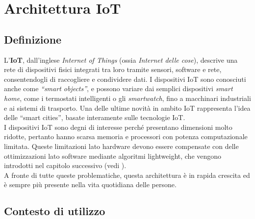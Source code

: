 \chapter{Architettura IoT}

\section{Definizione}

L'\textbf{IoT}, dall'inglese \textit{Internet of Things} (ossia \textit{Internet delle cose}), descrive una rete di dispositivi fisici integrati tra loro tramite sensori, software e rete, consentendogli di raccogliere e condividere dati. I dispositivi IoT sono conosciuti anche come \textit{``smart objects''}, e possono variare dai semplici dispositivi \textit{smart home}, come i termostati intelligenti o gli \textit{smartwatch}, fino a macchinari industriali e ai sistemi di trasporto. Una delle ultime novità in ambito IoT rappresenta l'idea delle ``smart cities'', basate interamente sulle tecnologie IoT\cite{iot-intro}. \\

\noindent I dispositivi IoT sono degni di interesse perché presentano dimensioni molto ridotte, pertanto hanno scarsa memoria e processori con potenza computazionale limitata. Queste limitazioni lato hardware devono essere compensate con delle ottimizzazioni lato software mediante algoritmi lightweight, che vengono introdotti nel capitolo successivo (vedi ). \\

\noindent A fronte di tutte queste problematiche, questa architettura è in rapida crescita ed è sempre più presente nella vita quotidiana delle persone.

\section{Contesto di utilizzo}

